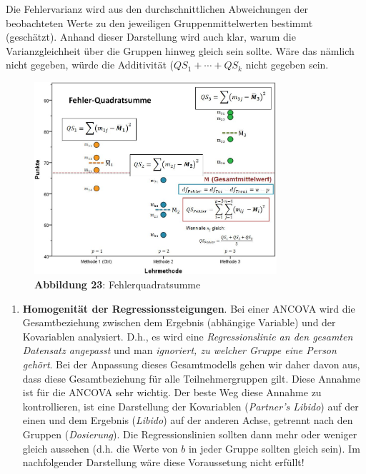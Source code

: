 \documentclass[]{article}
\providecommand{\tightlist}{%
  \setlength{\itemsep}{0pt}\setlength{\parskip}{0pt}}
\begin{document}
Die Fehlervarianz wird aus den durchschnittlichen Abweichungen der beobachteten Werte zu den jeweiligen Gruppenmittelwerten bestimmt (geschätzt). Anhand dieser Darstellung wird auch klar, warum die Varianzgleichheit über die Gruppen hinweg gleich sein sollte. Wäre das nämlich nicht gegeben, würde die Additivität (\(QS_1 + \cdots + QS_k\) nicht gegeben sein.

\begin{figure}
\centering
\includegraphics[width=0.8\textwidth,height=\textheight]{Images/ANOVA_QS_Fehler_Graphisch.jpg}
\caption{\textbf{Abbildung 23}: Fehlerquadratsumme}
\end{figure}

\begin{enumerate}
\def\labelenumi{\arabic{enumi}.}
\setcounter{enumi}{1}
\tightlist
\item
  \textbf{Homogenität der Regressionssteigungen}.
  Bei einer ANCOVA wird die Gesamtbeziehung zwischen dem Ergebnis (abhängige Variable) und der Kovariablen analysiert. D.h., es wird eine \emph{Regressionslinie an den gesamten Datensatz angepasst} und man \emph{ignoriert, zu welcher Gruppe eine Person gehört}. Bei der Anpassung dieses Gesamtmodells gehen wir daher davon aus, dass diese Gesamtbeziehung für alle Teilnehmergruppen gilt. Diese Annahme ist für die ANCOVA sehr wichtig. Der beste Weg diese Annahme zu kontrollieren, ist eine Darstellung der Kovariablen (\emph{Partner's Libido}) auf der einen und dem Ergebnis (\emph{Libido}) auf der anderen Achse, getrennt nach den Gruppen (\emph{Dosierung}). Die Regressionslinien sollten dann mehr oder weniger gleich aussehen (d.h. die Werte von \(b\) in jeder Gruppe sollten gleich sein). Im nachfolgender Darstellung wäre diese Voraussetung nicht erfüllt!
\end{enumerate}
\end{document}
